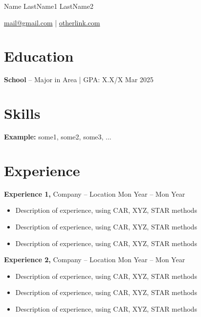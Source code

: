 \documentclass[11pt]{article}
\begin{document}
\centerline{\Huge Name LastName1 LastName2}

\vspace{5pt}

\centerline{\href{mailto:mail@gmail.com}{mail@gmail.com} | \href{https://otherlink.com}{otherlink.com}}


\vspace{-10pt}

\section*{Education}
\textbf{School} -- Major in Area | GPA: X.X/X \hfill Mar 2025

\vspace{-12.5pt}

\section*{Skills}
\textbf{Example:} some1, some2, some3, ...\\

\vspace{-12.5pt}

\section*{Experience}
\textbf{Experience 1,} {Company} -- Location \hfill Mon Year -- Mon Year \\
\vspace{-9pt}
\begin{itemize}
  \item Description of experience, using CAR, XYZ, STAR methods
  \item Description of experience, using CAR, XYZ, STAR methods
  \item Description of experience, using CAR, XYZ, STAR methods
\end{itemize}


\textbf{Experience 2,} {Company} -- Location \hfill Mon Year -- Mon Year \\
\vspace{-9pt}
\begin{itemize}
  \item Description of experience, using CAR, XYZ, STAR methods
  \item Description of experience, using CAR, XYZ, STAR methods
  \item Description of experience, using CAR, XYZ, STAR methods
\end{itemize}
\end{document}
